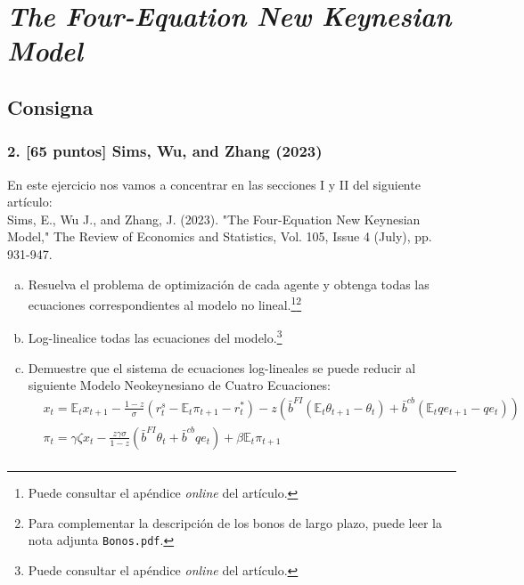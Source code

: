 \documentclass[10pt,a4paper]{article}
\begin{document}



\section[The Four-Equation New Keynesian Model]{\emph{The Four-Equation New Keynesian Model}}
\subsection{Consigna}
\begin{mdframed}
	\subsubsection[Ejercicio 2]{2. [65 puntos] Sims, Wu, and Zhang (2023)}
	En este ejercicio nos vamos a concentrar en las secciones I y II del siguiente artículo:\\
	Sims, E., Wu J., and Zhang, J. (2023). "The Four-Equation New Keynesian Model," The Review of Economics and Statistics, Vol. 105, Issue 4 (July), pp. 931-947.
	\begin{enumerate}[(a)]
		\item Resuelva el problema de optimización de cada agente y obtenga todas las ecuaciones correspondientes al modelo no lineal.\footnote{Puede consultar el apéndice \emph{online} del artículo.}\footnote{Para complementar la descripción de los bonos de largo plazo, puede leer la nota adjunta \texttt{Bonos.pdf}.}
		\item Log-linealice todas las ecuaciones del modelo.\footnote{Puede consultar el apéndice \emph{online} del artículo.}
		\item Demuestre que el sistema de ecuaciones log-lineales se puede reducir al siguiente Modelo Neokeynesiano de Cuatro Ecuaciones:
		      \begin{equation*}
			      \begin{aligned}
				       & x_{t}=\mathbb{E}_{t} x_{t+1}-\frac{1-z}{\sigma}\left(r_{t}^{s}-\mathbb{E}_{t} \pi_{t+1}-r_{t}^{*}\right)-z\left(\bar{b}^{F I}\left(\mathbb{E}_{t} \theta_{t+1}-\theta_{t}\right)+\bar{b}^{c b}\left(\mathbb{E}_{t} q e_{t+1}-q e_{t}\right)\right) \\
				       & \pi_{t}=\gamma \zeta x_{t}-\frac{z \gamma \sigma}{1-z}\left(\bar{b}^{F I} \theta_{t}+\bar{b}^{c b} q e_{t}\right)+\beta \mathbb{E}_{t} \pi_{t+1}                                                                                                   \\

\end{aligned}
\end{equation*}
\end{enumerate}
\end{mdframed}
\end{document}
